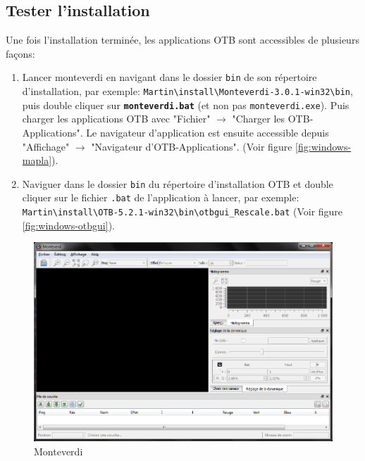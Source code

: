 \documentclass[10pt,a4paper]{article}
\begin{document}
\subsection{Tester l'installation}
Une fois l'installation terminée, les applications OTB sont accessibles de
plusieurs façons:
\begin{enumerate}

  \item Lancer monteverdi en navigant dans le dossier \texttt{bin} de son répertoire
d'installation, par exemple:
\texttt{Martin{\textbackslash}install{\textbackslash}Monteverdi-3.0.1-win32{\textbackslash}bin},
puis double cliquer sur \textbf{\texttt{monteverdi.bat}} (et non pas
\texttt{monteverdi.exe}).
Puis charger les applications OTB avec "Fichier" $\rightarrow$ "Charger les
OTB-Applications".
Le navigateur d'application est ensuite accessible depuis "Affichage"
$\rightarrow$ "Navigateur d'OTB-Applications".
(Voir figure \ref{fig:windows-mapla}).

  \item Naviguer dans le dossier \texttt{bin} du répertoire d'installation OTB et double cliquer sur le
  fichier \texttt{.bat} de l'application à lancer, par exemple:\\
  \texttt{Martin{\textbackslash}install{\textbackslash}OTB-5.2.1-win32{\textbackslash}bin{\textbackslash}otbgui\_Rescale.bat}
  (Voir figure \ref{fig:windows-otbgui}).

\end{enumerate}

\begin{figure}[h]
  \center
  \includegraphics[width=1\textwidth]{Art/windows-monteverdi.png}
  \caption[]{Monteverdi}
  \label{fig:windows-monteverdi}
\end{figure}
\end{document}
